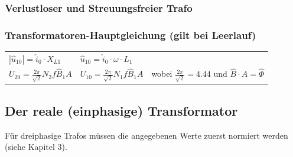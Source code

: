 		\subsubsection{Verlustloser und Streuungsfreier Trafo}
			 	
		\subsubsection{Transformatoren-Hauptgleichung (gilt bei Leerlauf)}
			\begin{tabular}{p{7cm}p{4.5cm}p{5cm}}
      			$| \hat{u}_{10} | = \hat{i}_0 \cdot X_{L1}$
      			& 	$\hat{u}_{10} = \hat{i}_0 \cdot \omega \cdot L_1$ \\
      		
				$U_{20} = \frac{2\pi}{\sqrt{2}}N_2 f \hat{B}_1 A$
				&
            	$U_{10} = \frac{2\pi}{\sqrt{2}}N_1 f \hat{B}_1 A$ &
					wobei $\frac{2\pi}{\sqrt{2}} = 4.44$ und $\hat{B} \cdot A = \hat{\Phi}$ 
			\end{tabular}
	\subsection{Der reale (einphasige) Transformator}
		Für dreiphasige Trafos müssen die angegebenen Werte zuerst normiert werden (siehe Kapitel 3).
